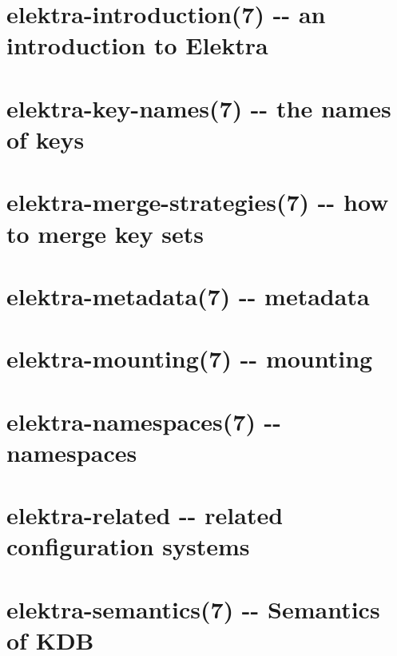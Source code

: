 \documentclass[twoside]{book}
\newcommand{\+}{\discretionary{\mbox{\scriptsize$\hookleftarrow$}}{}{}}
\begin{document}
\chapter{elektra-\/introduction(7) -\/-\/ an introduction to Elektra}
\label{doc_help_elektra-introduction_md}

\chapter{elektra-\/key-\/names(7) -\/-\/ the names of keys}
\label{doc_help_elektra-key-names_md}

\chapter{elektra-\/merge-\/strategies(7) -\/-\/ how to merge key sets}
\label{doc_help_elektra-merge-strategy_md}

\chapter{elektra-\/metadata(7) -\/-\/ metadata}
\label{doc_help_elektra-metadata_md}

\chapter{elektra-\/mounting(7) -\/-\/ mounting}
\label{doc_help_elektra-mounting_md}

\chapter{elektra-\/namespaces(7) -\/-\/ namespaces}
\label{doc_help_elektra-namespaces_md}

\chapter{elektra-\/related -\/-\/ related configuration systems}
\label{doc_help_elektra-related_md}

\chapter{elektra-\/semantics(7) -\/-\/ Semantics of K\+DB}
\label{doc_help_elektra-semantics_md}

\end{document}
